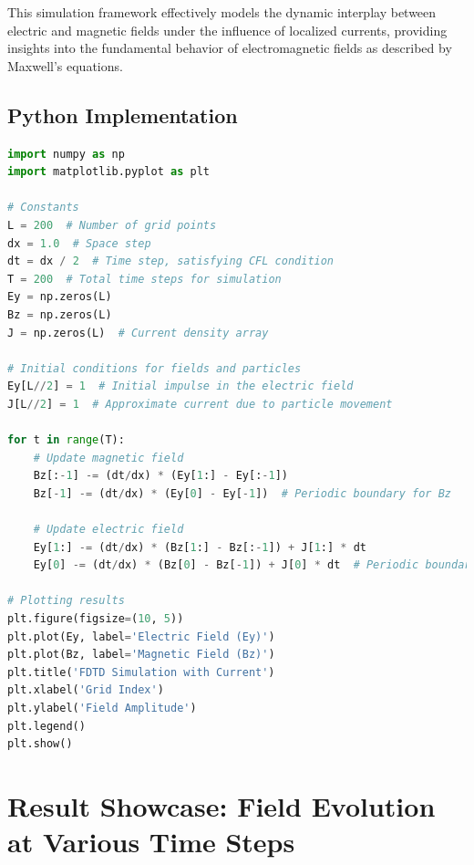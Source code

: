 \documentclass{article}[a4paper]
\begin{document}
This simulation framework effectively models the dynamic interplay between electric and magnetic fields under the influence of localized currents, providing insights into the fundamental behavior of electromagnetic fields as described by Maxwell's equations.

\subsection{Python Implementation}
\begin{lstlisting}[language=python, caption=Implementation of FDTD with Dynamic Current Particles]
import numpy as np
import matplotlib.pyplot as plt

# Constants
L = 200  # Number of grid points
dx = 1.0  # Space step
dt = dx / 2  # Time step, satisfying CFL condition
T = 200  # Total time steps for simulation
Ey = np.zeros(L)
Bz = np.zeros(L)
J = np.zeros(L)  # Current density array

# Initial conditions for fields and particles
Ey[L//2] = 1  # Initial impulse in the electric field
J[L//2] = 1  # Approximate current due to particle movement

for t in range(T):
    # Update magnetic field
    Bz[:-1] -= (dt/dx) * (Ey[1:] - Ey[:-1])
    Bz[-1] -= (dt/dx) * (Ey[0] - Ey[-1])  # Periodic boundary for Bz

    # Update electric field
    Ey[1:] -= (dt/dx) * (Bz[1:] - Bz[:-1]) + J[1:] * dt
    Ey[0] -= (dt/dx) * (Bz[0] - Bz[-1]) + J[0] * dt  # Periodic boundary for Ey

# Plotting results
plt.figure(figsize=(10, 5))
plt.plot(Ey, label='Electric Field (Ey)')
plt.plot(Bz, label='Magnetic Field (Bz)')
plt.title('FDTD Simulation with Current')
plt.xlabel('Grid Index')
plt.ylabel('Field Amplitude')
plt.legend()
plt.show()
\end{lstlisting}

\section{Result Showcase: Field Evolution at Various Time Steps}
\end{document}
